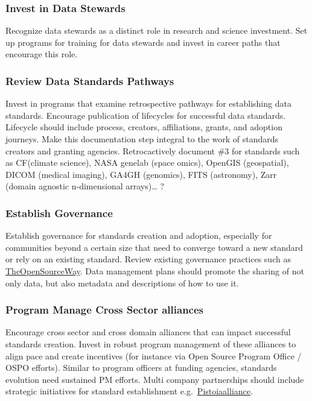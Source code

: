 \documentclass[
  letterpaper,
  DIV=11,
  numbers=noendperiod]{scrartcl}
\begin{document}
\subsubsection{Invest in Data Stewards}\label{invest-in-data-stewards}

Recognize data stewards as a distinct role in research and science
investment. Set up programs for training for data stewards and invest in
career paths that encourage this role.

\subsubsection{Review Data Standards
Pathways}\label{review-data-standards-pathways}

Invest in programs that examine retrospective pathways for establishing
data standards. Encourage publication of lifecycles for successful data
standards. Lifecycle should include process, creators, affiliations,
grants, and adoption journeys. Make this documentation step integral to
the work of standards creators and granting agencies. Retrocactively
document \#3 for standards such as CF(climate science), NASA genelab
(space omics), OpenGIS (geospatial), DICOM (medical imaging), GA4GH
(genomics), FITS (astronomy), Zarr (domain agnostic n-dimensional
arrays)\ldots{} ?

\subsubsection{Establish Governance}\label{establish-governance}

Establish governance for standards creation and adoption, especially for
communities beyond a certain size that need to converge toward a new
standard or rely on an existing standard. Review existing governance
practices such as
\href{https://www.theopensourceway.org/the_open_source_way-guidebook-2.0.html\#_project_and_community_governance}{TheOpenSourceWay}.
Data management plans should promote the sharing of not only data, but
also metadata and descriptions of how to use it.

\subsubsection{Program Manage Cross Sector
alliances}\label{program-manage-cross-sector-alliances}

Encourage cross sector and cross domain alliances that can impact
successful standards creation. Invest in robust program management of
these alliances to align pace and create incentives (for instance via
Open Source Program Office / OSPO efforts). Similar to program officers
at funding agencies, standards evolution need sustained PM efforts.
Multi company partnerships should include strategic initiatives for
standard establishment
e.g.~\href{https://www.pistoiaalliance.org/news/press-release-pistoia-alliance-launches-idmp-1-0/}{Pistoiaalliance}.
\end{document}
